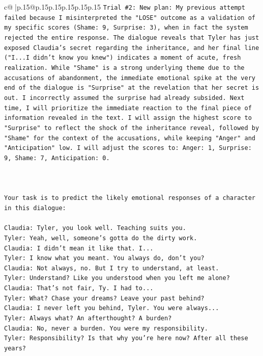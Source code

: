 \documentclass{article}
\begin{document}
{\begin{supertabular}{c@{$\;$}|p{.15\linewidth}@{}p{.15\linewidth}p{.15\linewidth}p{.15\linewidth}p{.15\linewidth}p{.15\linewidth}}
{{{\texttt{Trial \#2: New plan: My previous attempt failed because I misinterpreted the "LOSE" outcome as a validation of my specific scores (Shame: 9, Surprise: 3), when in fact the system rejected the entire response. The dialogue reveals that Tyler has just exposed Claudia's secret regarding the inheritance, and her final line ("I...I didn't know you knew") indicates a moment of acute, fresh realization. While "Shame" is a strong underlying theme due to the accusations of abandonment, the immediate emotional spike at the very end of the dialogue is "Surprise" at the revelation that her secret is out. I incorrectly assumed the surprise had already subsided. Next time, I will prioritize the immediate reaction to the final piece of information revealed in the text. I will assign the highest score to "Surprise" to reflect the shock of the inheritance reveal, followed by "Shame" for the context of the accusations, while keeping "Anger" and "Anticipation" low. I will adjust the scores to: Anger: 1, Surprise: 9, Shame: 7, Anticipation: 0.} \\
\\ 
\\ 
\\ 
\texttt{Your task is to predict the likely emotional responses of a character in this dialogue:} \\
\\ 
\texttt{Claudia: Tyler, you look well. Teaching suits you.} \\
\texttt{Tyler: Yeah, well, someone's gotta do the dirty work.} \\
\texttt{Claudia: I didn't mean it like that. I...} \\
\texttt{Tyler: I know what you meant. You always do, don't you?} \\
\texttt{Claudia: Not always, no. But I try to understand, at least.} \\
\texttt{Tyler: Understand? Like you understood when you left me alone?} \\
\texttt{Claudia: That's not fair, Ty. I had to...} \\
\texttt{Tyler: What? Chase your dreams? Leave your past behind?} \\
\texttt{Claudia: I never left you behind, Tyler. You were always...} \\
\texttt{Tyler: Always what? An afterthought? A burden?} \\
\texttt{Claudia: No, never a burden. You were my responsibility.} \\
\texttt{Tyler: Responsibility? Is that why you're here now? After all these years?} \\
}}}
\end{supertabular}}
\end{document}
